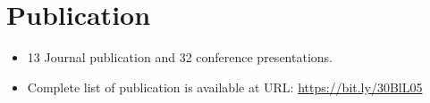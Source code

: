 \documentclass{my_cv}%
\begin{document}
\section{Publication}
\vspace{1em}
%
\begin{itemize}
    \item 13 Journal publication and 32 conference presentations.
    \item Complete list of publication is available at URL: \href{https://bit.ly/30BlL05}{https://bit.ly/30BlL05}
\end{itemize}

\end{document}
